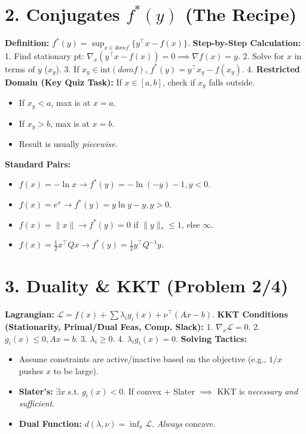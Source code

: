 \section{2. Conjugates $f^*(y)$ (The Recipe)}
\textbf{Definition:} $f^*(y) = \sup_{x \in dom f} \{y^\top x - f(x)\}$.
\textbf{Step-by-Step Calculation:}
1. Find stationary pt: $\nabla_x (y^\top x - f(x)) = 0 \implies
\nabla f(x) = y$.
2. Solve for $x$ in terms of $y$ ($x_y$).
3. If $x_y \in \text{int}(dom f)$, $f^*(y) = y^\top x_y - f(x_y)$.
4. \textbf{Restricted Domain (Key Quiz Task):} If $x \in [a, b]$,
check if $x_y$ falls outside.
\begin{itemize}[leftmargin=*]
  \item If $x_y < a$, max is at $x=a$.
  \item If $x_y > b$, max is at $x=b$.
  \item Result is usually \textit{piecewise}.
\end{itemize}
\textbf{Standard Pairs:}
\begin{itemize}[leftmargin=*]
  \item $f(x) = -\ln x \to f^*(y) = -\ln(-y)-1, y<0$.
  \item $f(x) = e^x \to f^*(y) = y \ln y - y, y>0$.
  \item $f(x) = \|x\| \to f^*(y) = 0$ if $\|y\|_* \le 1$, else $\infty$.
  \item $f(x) = \frac{1}{2}x^\top Q x \to f^*(y) = \frac{1}{2}y^\top Q^{-1} y$.
\end{itemize}

\section{3. Duality \& KKT (Problem 2/4)}
\textbf{Lagrangian:} $\mathcal{L} = f(x) + \sum \lambda_i g_i(x) +
\nu^\top(Ax-b)$.
\textbf{KKT Conditions (Stationarity, Primal/Dual Feas, Comp. Slack):}
1. $\nabla_x \mathcal{L} = 0$.
2. $g_i(x) \le 0, Ax=b$.
3. $\lambda_i \ge 0$.
4. $\lambda_i g_i(x) = 0$.
\textbf{Solving Tactics:}
\begin{itemize}[leftmargin=*]
  \item Assume constraints are active/inactive based on the objective
    (e.g., $1/x$ pushes $x$ to be large).
  \item \textbf{Slater's:} $\exists x$ s.t. $g_i(x) < 0$. If convex +
    Slater $\implies$ KKT is \textit{necessary and sufficient}.
  \item \textbf{Dual Function:} $d(\lambda, \nu) = \inf_x
    \mathcal{L}$. \textit{Always} concave.
\end{itemize}

